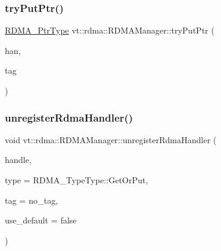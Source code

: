 \mbox{\label{structvt_1_1rdma_1_1_r_d_m_a_manager_afe917ba8c9a44175dd0766f3f0321e61}} 
\subsubsection{\texorpdfstring{try\+Put\+Ptr()}{tryPutPtr()}}
{\footnotesize\ttfamily \hyperlink{namespacevt_aab05b4a584f7ee835a6d0f66915cf59b}{R\+D\+M\+A\+\_\+\+Ptr\+Type} vt\+::rdma\+::\+R\+D\+M\+A\+Manager\+::try\+Put\+Ptr (\begin{DoxyParamCaption}\item[{\hyperlink{namespacevt_a10442579ec4e7ebef223818e64bcf908}{R\+D\+M\+A\+\_\+\+Handle\+Type} const \&}]{han,  }\item[{\hyperlink{namespacevt_a84ab281dae04a52a4b243d6bf62d0e52}{Tag\+Type} const \&}]{tag }\end{DoxyParamCaption})\hspace{0.3cm}{\ttfamily [private]}}

\mbox{\label{structvt_1_1rdma_1_1_r_d_m_a_manager_a59de11a7b7a8034a2e8e27a10897ce01}} 
\subsubsection{\texorpdfstring{unregister\+Rdma\+Handler()}{unregisterRdmaHandler()}\hspace{0.1cm}{\footnotesize\ttfamily [1/2]}}
{\footnotesize\ttfamily void vt\+::rdma\+::\+R\+D\+M\+A\+Manager\+::unregister\+Rdma\+Handler (\begin{DoxyParamCaption}\item[{\hyperlink{namespacevt_a10442579ec4e7ebef223818e64bcf908}{R\+D\+M\+A\+\_\+\+Handle\+Type} const \&}]{handle,  }\item[{\hyperlink{namespacevt_1_1rdma_ac848e1d9da43db6294bd06f83e5d3946}{R\+D\+M\+A\+\_\+\+Type\+Type} const \&}]{type = {\ttfamily RDMA\+\_\+TypeType\+:\+:GetOrPut},  }\item[{\hyperlink{namespacevt_a84ab281dae04a52a4b243d6bf62d0e52}{Tag\+Type} const \&}]{tag = {\ttfamily no\+\_\+tag},  }\item[{bool const \&}]{use\+\_\+default = {\ttfamily false} }\end{DoxyParamCaption})}



